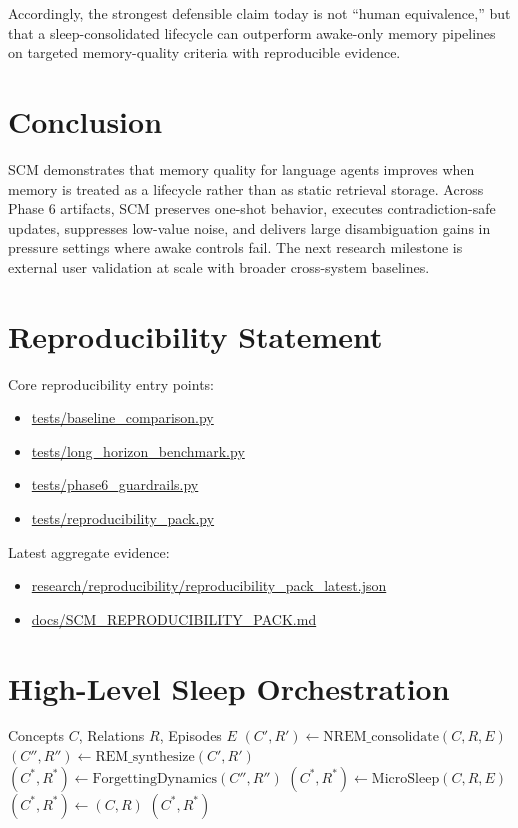 \documentclass[11pt,a4paper]{article}
\begin{document}
Accordingly, the strongest defensible claim today is not ``human equivalence,'' but that a sleep-consolidated lifecycle can outperform awake-only memory pipelines on targeted memory-quality criteria with reproducible evidence.

\section{Conclusion}
SCM demonstrates that memory quality for language agents improves when memory is treated as a lifecycle rather than as static retrieval storage. Across Phase 6 artifacts, SCM preserves one-shot behavior, executes contradiction-safe updates, suppresses low-value noise, and delivers large disambiguation gains in pressure settings where awake controls fail. The next research milestone is external user validation at scale with broader cross-system baselines.

\section*{Reproducibility Statement}
Core reproducibility entry points:
\begin{itemize}[leftmargin=1.4em]
    \item \url{tests/baseline_comparison.py}
    \item \url{tests/long_horizon_benchmark.py}
    \item \url{tests/phase6_guardrails.py}
    \item \url{tests/reproducibility_pack.py}
\end{itemize}
Latest aggregate evidence:
\begin{itemize}[leftmargin=1.4em]
    \item \url{research/reproducibility/reproducibility_pack_latest.json}
    \item \url{docs/SCM_REPRODUCIBILITY_PACK.md}
\end{itemize}

\appendix
\section{High-Level Sleep Orchestration}
\begin{algorithm}[htbp]
\caption{SCM Sleep Orchestration (simplified)}
\label{alg:sleep}
\begin{algorithmic}[1]
\Require Concepts $C$, Relations $R$, Episodes $E$
    \State $(C',R') \gets \text{NREM\_consolidate}(C,R,E)$
    \State $(C'',R'') \gets \text{REM\_synthesize}(C',R')$
    \State $(C^*,R^*) \gets \text{ForgettingDynamics}(C'',R'')$
    \State $(C^*,R^*) \gets \text{MicroSleep}(C,R,E)$
\Else
    \State $(C^*,R^*) \gets (C,R)$
\EndIf
\State \Return $(C^*,R^*)$
\end{algorithmic}
\end{algorithm}
\end{document}
